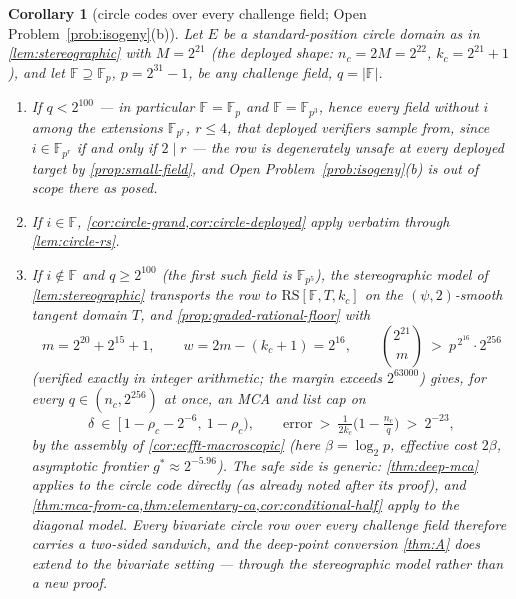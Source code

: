 \documentclass[11pt]{article}
\newtheorem{corollary}[theorem]{Corollary}
\theoremstyle{definition}
\theoremstyle{remark}
\newcommand{\F}{\mathbb{F}}
\newcommand{\RS}{\mathrm{RS}}
\begin{document}
\begin{corollary}[circle codes over every challenge field; Open Problem~\ref{prob:isogeny}\textup{(b)}]\label{cor:circle-anyfield}
Let $E$ be a standard-position circle domain as in \cref{lem:stereographic} with $M=2^{21}$ \textup(the deployed shape: $n_c=2M=2^{22}$, $k_c=2^{21}+1$\textup), and let $\F\supseteq\F_p$, $p=2^{31}-1$, be any challenge field, $q=|\F|$.
\begin{enumerate}[label=\textup{(\roman*)}]
\item If $q<2^{100}$ --- in particular $\F=\F_p$ and $\F=\F_{p^3}$, hence every field without $i$ among the extensions $\F_{p^r}$, $r\le4$, that deployed verifiers sample from, since $i\in\F_{p^r}$ if and only if $2\mid r$ --- the row is degenerately unsafe at every deployed target by \cref{prop:small-field}, and Open Problem~\ref{prob:isogeny}\textup{(b)} is out of scope there as posed.
\item If $i\in\F$, \cref{cor:circle-grand,cor:circle-deployed} apply verbatim through \cref{lem:circle-rs}.
\item If $i\notin\F$ and $q\ge2^{100}$ \textup(the first such field is $\F_{p^5}$\textup), the stereographic model of \cref{lem:stereographic} transports the row to $\RS[\F,T,k_c]$ on the $(\psi,2)$-smooth tangent domain $T$, and \cref{prop:graded-rational-floor} with
\[
m=2^{20}+2^{15}+1,\qquad w=2m-(k_c+1)=2^{16},\qquad
\binom{2^{21}}{m}\ >\ p^{\,2^{16}}\cdot2^{256}
\]
\textup(verified exactly in integer arithmetic; the margin exceeds $2^{63000}$\textup) gives, for every $q\in(n_c,2^{256})$ at once, an MCA and list cap on
\[
\delta\ \in\ \bigl[\,1-\rho_c-2^{-6},\ 1-\rho_c\bigr),
\qquad
\text{error}\ >\ \tfrac1{2k_c}\bigl(1-\tfrac{n_c}q\bigr)\ >\ 2^{-23},
\]
by the assembly of \cref{cor:ecfft-macroscopic} \textup(here $\beta=\log_2p$, effective cost $2\beta$, asymptotic frontier $g^*\approx2^{-5.96}$\textup). The safe side is generic: \cref{thm:deep-mca} applies to the circle code directly \textup(as already noted after its proof\textup), and \cref{thm:mca-from-ca,thm:elementary-ca,cor:conditional-half} apply to the diagonal model. Every bivariate circle row over every challenge field therefore carries a two-sided sandwich, and the deep-point conversion \cref{thm:A} does extend to the bivariate setting --- through the stereographic model rather than a new proof.
\end{enumerate}
\end{corollary}
\end{document}
